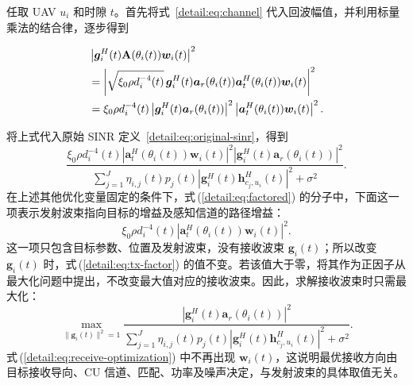 \documentclass[11pt,a4paper]{ctexart}
\begin{document}
任取 UAV $u_i$ 和时隙 $t$。首先将式~\eqref{detail:eq:channel} 代入回波幅值，并利用标量乘法的结合律，逐步得到
\begin{samepage}
\begin{align}
&\left|\bm g_i^H(t)\mathbf A(\theta_i(t))\bm w_i(t)\right|^2\notag\\
&=\left|\sqrt{\xi_0\rho d_i^{-4}(t)}\,
\bm g_i^H(t)\bm a_r(\theta_i(t))\bm a_t^H(\theta_i(t))\bm w_i(t)\right|^2\notag\\
&=\xi_0\rho d_i^{-4}(t)
\left|\bm g_i^H(t)\bm a_r(\theta_i(t))\right|^2
\left|\bm a_t^H(\theta_i(t))\bm w_i(t)\right|^2.\label{detail:eq:factor}
\end{align}
\end{samepage}
将上式代入原始 SINR 定义~\eqref{detail:eq:original-sinr}，得到
\begin{equation}\label{detail:eq:factored}
\frac{\xi_0\rho d_i^{-4}(t)
\left|\bm a_t^H(\theta_i(t))\bm w_i(t)\right|^2
\left|\bm g_i^H(t)\bm a_r(\theta_i(t))\right|^2}
{\displaystyle\sum_{j=1}^J\eta_{i,j}(t)p_j(t)
\left|\bm g_i^H(t)\bm h_{c_j,u_i}^{H}(t)\right|^2+\sigma^2}.
\end{equation}
在上述其他优化变量固定的条件下，式\,(\ref{detail:eq:factored}) 的分子中，下面这一项表示发射波束指向目标的增益及感知信道的路径增益：
\begin{equation}\label{detail:eq:tx-factor}
\xi_0\rho d_i^{-4}(t)
\left|\bm a_t^H(\theta_i(t))\bm w_i(t)\right|^2.
\end{equation}
这一项只包含目标参数、位置及发射波束，没有接收波束 $\bm g_i(t)$；所以改变 $\bm g_i(t)$ 时，式\,(\ref{detail:eq:tx-factor}) 的值不变。若该值大于零，将其作为正因子从最大化问题中提出，不改变最大值对应的接收波束。因此，求解接收波束时只需最大化：
\begin{equation}\label{detail:eq:receive-optimization}
\max_{\|\bm g_i(t)\|^2=1}
\frac{\left|\bm g_i^H(t)\bm a_r(\theta_i(t))\right|^2}
{\displaystyle\sum_{j=1}^J\eta_{i,j}(t)p_j(t)
\left|\bm g_i^H(t)\bm h_{c_j,u_i}^{H}(t)\right|^2+\sigma^2}.
\end{equation}
式\,(\ref{detail:eq:receive-optimization}) 中不再出现 $\bm w_i(t)$，这说明最优接收方向由目标接收导向、CU 信道、匹配、功率及噪声决定，与发射波束的具体取值无关。
\end{document}
